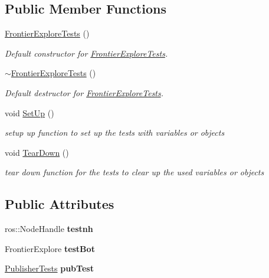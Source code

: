\subsection*{Public Member Functions}
\begin{DoxyCompactItemize}
\item 
\hyperlink{classFrontierExploreTests_a3033043f511d924f988782a3a802f63e}{Frontier\+Explore\+Tests} ()
\begin{DoxyCompactList}\small\item\em Default constructor for \hyperlink{classFrontierExploreTests}{Frontier\+Explore\+Tests}. \end{DoxyCompactList}\item 
\hyperlink{classFrontierExploreTests_a7cb89f2326e1501e8879a7fdc5581d4c}{$\sim$\+Frontier\+Explore\+Tests} ()
\begin{DoxyCompactList}\small\item\em Default destructor for \hyperlink{classFrontierExploreTests}{Frontier\+Explore\+Tests}. \end{DoxyCompactList}\item 
void \hyperlink{classFrontierExploreTests_a8ffa7be235a89d196f8a0ab569838966}{Set\+Up} ()
\begin{DoxyCompactList}\small\item\em setup up function to set up the tests with variables or objects \end{DoxyCompactList}\item 
void \hyperlink{classFrontierExploreTests_a868ce040cbbb4ca5f1ad2573f43f4b22}{Tear\+Down} ()
\begin{DoxyCompactList}\small\item\em tear down function for the tests to clear up the used variables or objects \end{DoxyCompactList}\end{DoxyCompactItemize}
\subsection*{Public Attributes}
\begin{DoxyCompactItemize}
\item 
ros\+::\+Node\+Handle {\bfseries testnh}\hypertarget{classFrontierExploreTests_a0684ad7e48d96d232fad6b4294938f60}{}\label{classFrontierExploreTests_a0684ad7e48d96d232fad6b4294938f60}

\item 
Frontier\+Explore {\bfseries test\+Bot}\hypertarget{classFrontierExploreTests_ac738c36e2f8b1a633167b8ca0afd2626}{}\label{classFrontierExploreTests_ac738c36e2f8b1a633167b8ca0afd2626}

\item 
\hyperlink{classPublisherTests}{Publisher\+Tests} {\bfseries pub\+Test}\hypertarget{classFrontierExploreTests_a24f2d818efe00a4566fd50c9f3d18a15}{}\label{classFrontierExploreTests_a24f2d818efe00a4566fd50c9f3d18a15}

\end{DoxyCompactItemize}


